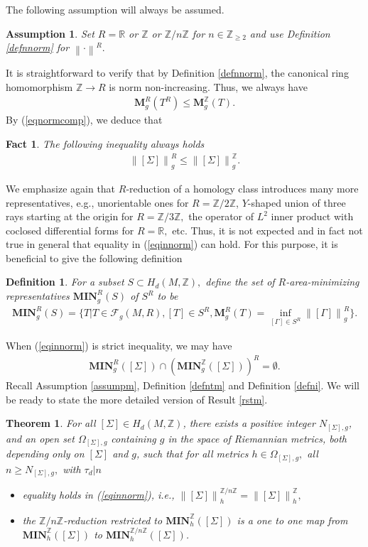 \documentclass[11pt,a4paper]{amsart}
\numberwithin{equation}{section}
\newcommand{\es}{\emptyset}
\newcommand{\mn}{\mathbf{MIN}}
\newcommand{\Om}{\Omega}
\newcommand{\Si}{\Sigma}
\newcommand{\ms}{\mathbf{M}}
\newcommand{\s}{\subset}
\newcommand{\no}[1]{\left\lVert#1\right\rVert}
\newcommand{\R}{\mathbb{R}}
\newcommand{\Z}{\mathbb{Z}}
\theoremstyle{plain}
\newtheorem{thm}{Theorem}
\newtheorem{assump}{Assumption}[subsection]
\newtheorem{fact}{Fact}[subsection]
\newtheorem{defn}{Definition}[subsection]
\theoremstyle{definition}
\numberwithin{equation}{subsection}
\begin{document}
	The following assumption will always be assumed.
	\begin{assump}\label{assumpcoef}
		Set $R=\R$ or $\Z$ or $\Z/n\Z$ for $n\in\Z_{\ge 2}$ and use Definition \ref{defnnorm} for $\no{\cdot}^R.$
	\end{assump}
	It is straightforward to verify that by Definition \ref{defnnorm}, the canonical ring homomorphism $\Z\to R$ is norm non-increasing. Thus, we always have
	\begin{align*}
		\ms^R_g(T^R)\le \ms_g^{\Z}(T).
	\end{align*}
	By (\ref{eqnormcomp}), we deduce that
	\begin{fact}\label{fctncmp}The following inequality always holds
		\begin{align}\label{eqinnorm}
			\no{[\Si]}^R_g\le \no{[\Si]}^{\Z}_g.
		\end{align}
	\end{fact}
	We emphasize again that $R$-reduction of a homology class introduces many more representatives, e.g., unorientable ones for $R=\Z/2\Z$, $Y$-shaped union of three rays starting at the origin for $R=\Z/3\Z,$ the operator of $L^2$ inner product with coclosed differential forms for $R=\R,$ etc. Thus, it is not expected and in fact not true in general that equality in (\ref{eqinnorm}) can hold. For this purpose, it is beneficial to give the following definition
	\begin{defn}
For a subset $S\s H_d(M,\Z),$		define the set of $R$-area-minimizing representatives $\mn_g^R\left(S\right)$ of $S^R$ to be
		\begin{align*}
			\mn_g^R\left(S\right)=\{T|T\in \mathcal{F}_g(M,R),[T]\in S^R,\ms^R_g(T)=\inf_{[\Gamma]\in S^R}\no{[\Gamma]}^R_g\}.
		\end{align*} 
	\end{defn}When (\ref{eqinnorm}) is strict inequality, we may have
	\begin{align}\label{eqesint}
		\mn_g^R\left([\Si]\right)\cap \left(\mn_g^{\Z}\left([\Si]\right)\right)^R=\es.
	\end{align} 
 Recall Assumption \ref{assumpm}, Definition \ref{defntm} and Definition \ref{defni}. We will be ready to state the more detailed version of Result \ref{rstm}.\begin{thm}\label{thmv}
		For all $[\Si]\in H_d(M,\Z)$, there exists a positive integer $N_{[\Si],g}$, and an open set $\Om_{[\Si],g}$ containing $g$ in the space of Riemannian metrics, both depending only on $[\Si]$ and $g$, such that for all metrics $h\in\Om_{[\Si],g},$ all $n\ge N_{[\Si],g},$ with $\tau_d|n$    
		\begin{itemize}
			\item equality holds in (\ref{eqinnorm}), i.e., $			\no{[\Si]}_h^{\Z/n\Z}=\no{[\Si]}_h^\Z,$
			\item the $\Z/n\Z$-reduction restricted to $\mn_h^{\Z}\left([\Si]\right)$ is a one to one map from  		$\mn_h^{\Z}\left([\Si]\right)$ to $\mn_h^{\Z/n\Z}\left([\Si]\right)$.	
		\end{itemize} 
	\end{thm}
\end{document}
